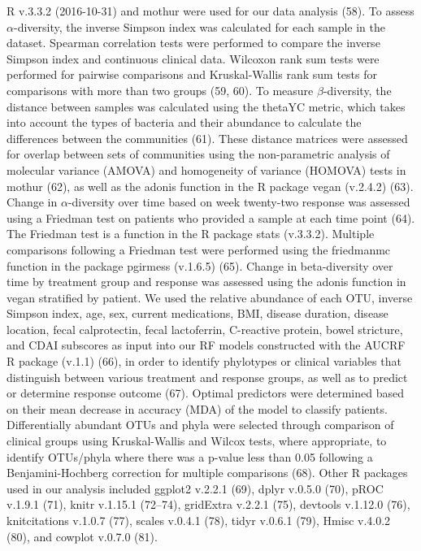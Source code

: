 \documentclass[11pt,]{article}
\begin{document}
R v.3.3.2 (2016-10-31) and mothur were used for our data analysis (58).
To assess \({\alpha}\)-diversity, the inverse Simpson index was
calculated for each sample in the dataset. Spearman correlation tests
were performed to compare the inverse Simpson index and continuous
clinical data. Wilcoxon rank sum tests were performed for pairwise
comparisons and Kruskal-Wallis rank sum tests for comparisons with more
than two groups (59, 60). To measure \({\beta}\)-diversity, the distance
between samples was calculated using the thetaYC metric, which takes
into account the types of bacteria and their abundance to calculate the
differences between the communities (61). These distance matrices were
assessed for overlap between sets of communities using the
non-parametric analysis of molecular variance (AMOVA) and homogeneity of
variance (HOMOVA) tests in mothur (62), as well as the adonis function
in the R package vegan (v.2.4.2) (63). Change in \({\alpha}\)-diversity
over time based on week twenty-two response was assessed using a
Friedman test on patients who provided a sample at each time point (64).
The Friedman test is a function in the R package stats (v.3.3.2).
Multiple comparisons following a Friedman test were performed using the
friedmanmc function in the package pgirmess (v.1.6.5) (65). Change in
beta-diversity over time by treatment group and response was assessed
using the adonis function in vegan stratified by patient. We used the
relative abundance of each OTU, inverse Simpson index, age, sex, current
medications, BMI, disease duration, disease location, fecal
calprotectin, fecal lactoferrin, C-reactive protein, bowel stricture,
and CDAI subscores as input into our RF models constructed with the
AUCRF R package (v.1.1) (66), in order to identify phylotypes or
clinical variables that distinguish between various treatment and
response groups, as well as to predict or determine response outcome
(67). Optimal predictors were determined based on their mean decrease in
accuracy (MDA) of the model to classify patients. Differentially
abundant OTUs and phyla were selected through comparison of clinical
groups using Kruskal-Wallis and Wilcox tests, where appropriate, to
identify OTUs/phyla where there was a p-value less than 0.05 following a
Benjamini-Hochberg correction for multiple comparisons (68). Other R
packages used in our analysis included ggplot2 v.2.2.1 (69), dplyr
v.0.5.0 (70), pROC v.1.9.1 (71), knitr v.1.15.1 (72--74), gridExtra
v.2.2.1 (75), devtools v.1.12.0 (76), knitcitations v.1.0.7 (77), scales
v.0.4.1 (78), tidyr v.0.6.1 (79), Hmisc v.4.0.2 (80), and cowplot
v.0.7.0 (81).
\end{document}
